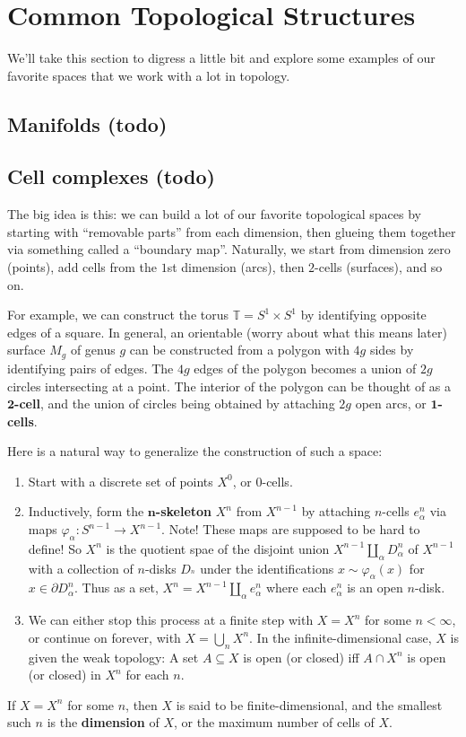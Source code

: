 \section{Common Topological Structures}
We'll take this section to digress a little bit and explore some examples of our favorite spaces that we work with a lot in topology.
\subsection{Manifolds (todo)}
\subsection{Cell complexes (todo)}
The big idea is this: we can build a lot of our favorite topological spaces by starting with ``removable parts'' from each dimension, then glueing them together via something called a ``boundary map''. Naturally, we start from dimension zero (points), add cells from the $1$st dimension (arcs), then $2$-cells (surfaces), and so on. 

For example, we can construct the torus $\mathbb{T}=S^1 \times S^1 $ by identifying opposite edges of a square. In general, an orientable (worry about what this means later) surface $M_g$ of genus $g$ can be constructed from a polygon with $4g$ sides by identifying pairs of edges. The $4g $ edges of the polygon becomes a union of $2g$ circles intersecting at a point. The interior of the polygon can be thought of as a $\mathbf 2$\textbf{-cell}, and the union of circles being obtained by attaching $2g$ open arcs, or $\mathbf 1$\textbf{-cells}. 

Here is a natural way to generalize the construction of such a space:
\begin{enumerate}[label=(\arabic*)]
    \item Start with a discrete set of points $X^0$, or $0$-cells.
    \item Inductively, form the $\mathbf n$\textbf{-skeleton} $X^n $ from $X^{n-1}$ by attaching $n$-cells $e_{\alpha }^n $ via maps $\varphi _{\alpha }\colon S^{n-1} \to X^{n-1}$. Note! These maps are supposed to be hard to define! So $X^n $ is the quotient spae of the disjoint union $X^{n-1}\amalg _{\alpha }D_{\alpha }^n $ of $X^{n-1}$ with a collection of $n$-disks $D_{^n }$ under the identifications $x\sim \varphi _{\alpha }(x)$ for $x\in \partial D_{\alpha }^n $. Thus as a set, $X^n =X^{n-1}\amalg_{\alpha }e_{\alpha }^n $ where each $e_{\alpha }^n $ is an open $n$-disk.
    \item We can either stop this process at a finite step with $X=X^n $ for some $n<\infty$, or continue on forever, with $X=\bigcup_{n} X^n $. In the infinite-dimensional case, $X$ is given the weak topology: A set $A\subseteq X$ is open (or closed) iff $A\cap X^n $ is open (or closed) in $X^n $ for each $n$.
\end{enumerate}
If $X=X^n $ for some $n$, then $X$ is said to be finite-dimensional, and the smallest such $n$ is the \textbf{dimension} of $X$, or the maximum number of cells of $X$.
